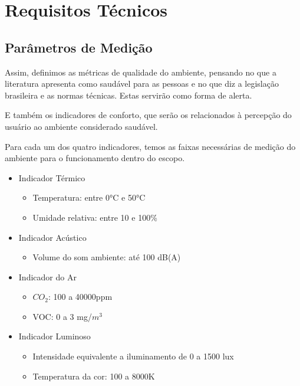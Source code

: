 \documentclass[../monografia.tex]{subfiles}
\begin{document}
\section{Requisitos Técnicos}

\subsection{Parâmetros de Medição}

Assim, definimos as métricas de qualidade do ambiente, pensando no que a literatura apresenta como saudável para as pessoas e no que diz a legislação brasileira e as normas técnicas. Estas servirão como forma de alerta. 

E também os indicadores de conforto, que serão os relacionados à percepção do usuário ao ambiente considerado saudável. 

Para cada um dos quatro indicadores, temos as faixas necessárias de medição do ambiente para o funcionamento dentro do escopo.

\begin{itemize}
	\item Indicador Térmico
	\begin{itemize}
		\item Temperatura: entre 0°C e 50°C
		\item Umidade relativa: entre 10 e 100\%
	\end{itemize} 
	\item Indicador Acústico
	\begin{itemize}
		\item Volume do som ambiente: até 100 dB(A)
	\end{itemize} 
	\item Indicador do Ar
	\begin{itemize}
		\item $CO_{2}$: 100 a 40000ppm
		\item VOC: 0 a 3 mg/$m^{3}$
	\end{itemize} 
	\item Indicador Luminoso
	\begin{itemize}
		\item Intensidade equivalente a iluminamento de 0 a 1500 lux
		\item Temperatura da cor: 100 a 8000K
	\end{itemize} 

\end{itemize}

\end{document}
